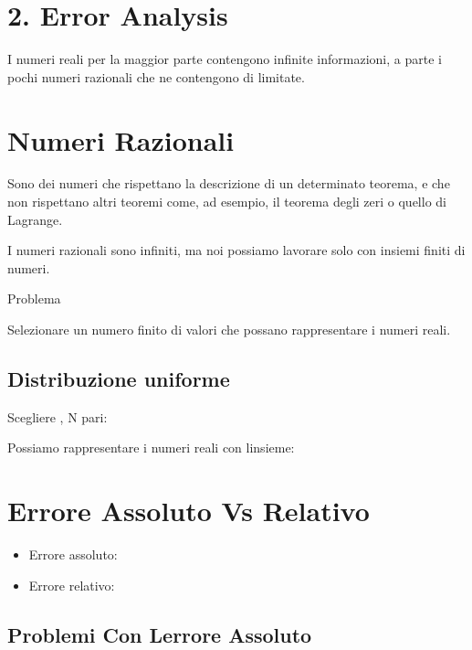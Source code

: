 \documentclass[
]{article}
\providecommand{\tightlist}{%
  \setlength{\itemsep}{0pt}\setlength{\parskip}{0pt}}
\begin{document}
\hypertarget{error-analysis}{%
\section{2. Error Analysis}\label{error-analysis}}

I numeri reali per la maggior parte contengono infinite informazioni, a
parte i pochi numeri razionali che ne contengono di limitate.

\hypertarget{numeri-razionali}{%
\section{Numeri Razionali}\label{numeri-razionali}}

Sono dei numeri che rispettano la descrizione di un determinato teorema,
e che non rispettano altri teoremi come, ad esempio, il teorema degli
zeri o quello di Lagrange.

I numeri razionali sono infiniti, ma noi possiamo lavorare solo con
insiemi finiti di numeri.

Problema

Selezionare un numero finito di valori che possano rappresentare i
numeri reali.

\hypertarget{distribuzione-uniforme}{%
\subsection{Distribuzione uniforme}\label{distribuzione-uniforme}}

Scegliere {}, N pari:\\
{}

Possiamo rappresentare i numeri reali con l\textquotesingle insieme:

\hypertarget{errore-assoluto-vs-relativo}{%
\section{Errore Assoluto Vs
Relativo}\label{errore-assoluto-vs-relativo}}

\begin{itemize}
\tightlist
\item
  Errore assoluto: {}
\item
  Errore relativo: {}
\end{itemize}

\hypertarget{problemi-con-lerrore-assoluto}{%
\subsection{Problemi Con L\textquotesingle errore
Assoluto}\label{problemi-con-lerrore-assoluto}}
\end{document}
